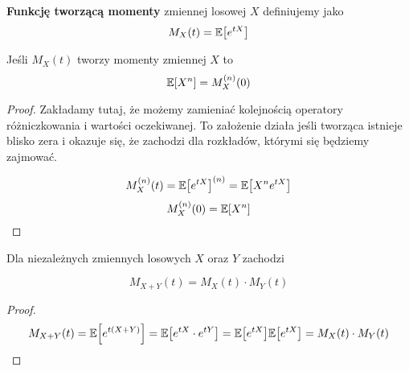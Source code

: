 \begin{definition}
	\textbf{Funkcję tworzącą momenty} zmiennej losowej \( X \) definiujemy jako
	\[
		M_X(t) = \expected{e^{tX}}
	\]
\end{definition}

\begin{theorem}[Twierdzenie 4.1  P\&C]
	Jeśli \( M_X(t) \) tworzy momenty zmiennej \( X \) to
	\[
		\expected{X^n} = M_X^{(n)}(0)
	\]
\end{theorem}
\begin{proof}
	Zakładamy tutaj, że możemy zamieniać kolejnością operatory różniczkowania i wartości oczekiwanej.
	To założenie działa jeśli tworząca istnieje blisko zera i okazuje się, że zachodzi dla rozkładów, którymi się będziemy zajmować.

	\[
		M_X^{(n)}(t) = \expected{e^{tX}}^{(n)}
		= \expected{X^n e^{tX}}
	\]
	\[
		M_X^{(n)}(0) = \expected{X^n}
	\]
\end{proof}

\begin{theorem}[Twierdzenie 4.3 P\&C]
	Dla niezależnych zmiennych losowych \( X \) oraz \( Y \) zachodzi

	\[
		M_{X + Y}(t) = M_X(t) \cdot M_Y(t)
	\]
\end{theorem}
\begin{proof}
	\[
		M_{X + Y}(t) = \expected{e^{t(X + Y)}} = \expected{e^{tX}\cdot e^{tY}} = \expected{e^{tX}}\expected{e^{tX}} = M_X(t) \cdot M_Y(t)
	\]
\end{proof}
